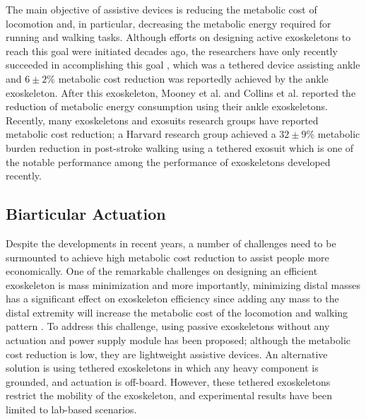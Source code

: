 \documentclass[10pt,letterpaper]{article}
\begin{document}
The main objective of assistive devices is reducing the metabolic cost of locomotion and, in particular, decreasing the metabolic energy required for running and walking tasks. Although efforts on designing active exoskeletons to reach this goal were initiated decades ago, the researchers have only recently succeeded in accomplishing this goal \cite{40}, which was a tethered device assisting ankle and  $6 \pm 2$\% metabolic cost reduction was reportedly achieved by the ankle exoskeleton. After this exoskeleton, Mooney et al. \cite{41} and Collins et al. \cite{42} reported the reduction of metabolic energy consumption using their ankle exoskeletons. Recently, many exoskeletons and exosuits research groups have reported metabolic cost reduction; a Harvard research group \cite{43} achieved a $32 \pm 9$\% metabolic burden reduction in post-stroke walking using a tethered exosuit which is one of the notable performance among the performance of exoskeletons developed recently.

\subsection*{Biarticular Actuation}
Despite the developments in recent years, a number of challenges need to be surmounted to achieve high metabolic cost reduction to assist people more economically. One of the remarkable challenges on designing an efficient exoskeleton is mass minimization\cite{41,44,45} and more importantly, minimizing distal masses \cite{45} has a significant effect on exoskeleton efficiency since adding any mass to the distal extremity will increase the metabolic cost of the locomotion \cite{45} and walking pattern \cite{44}. To address this challenge, using passive exoskeletons without any actuation and power supply module has been proposed; although the metabolic cost reduction is low, they are lightweight assistive devices\cite{42,46}. An alternative solution is using tethered exoskeletons in which any heavy component is grounded, and actuation is off-board\cite{40,47}. However, these tethered exoskeletons restrict the mobility of the exoskeleton, and experimental results have been limited to lab-based scenarios.\\
\end{document}
